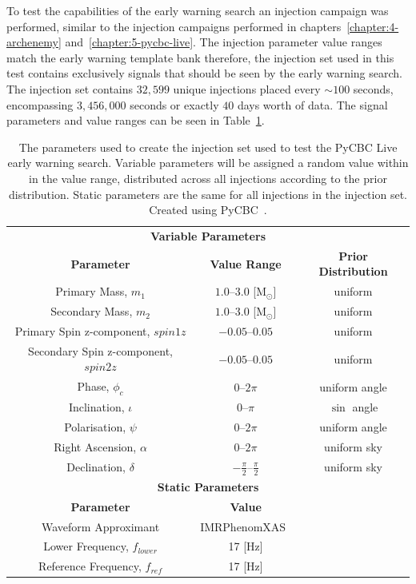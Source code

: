To test the capabilities of the early warning search an injection campaign was performed, similar to the injection campaigns performed in chapters~\ref{chapter:4-archenemy} and~\ref{chapter:5-pycbc-live}. The injection parameter value ranges match the early warning template bank therefore, the injection set used in this test contains exclusively signals that should be seen by the early warning search. The injection set contains $32,599$ unique injections placed every ${\sim}100$ seconds, encompassing $3,456,000$ seconds or exactly $40$ days worth of data. The signal parameters and value ranges can be seen in Table~\ref{6:tab:ew_inj_params}.
%
\begin{table}[ht]
    \centering
    \setlength{\tabcolsep}{4pt}
    \begin{tabular}{ccc}
        \toprule
        \multicolumn{3}{c}{\textbf{Variable Parameters}} \\
        \cmidrule(lr){1-3}
        \textbf{Parameter} & \textbf{Value Range} & \textbf{Prior Distribution} \\
        \midrule
        Primary Mass, $m_1$ & $1.0\text{--}3.0$ [$\text{M$_{\odot}$}$] & uniform \\
        Secondary Mass, $m_2$ & $1.0\text{--}3.0$ [$\text{M$_{\odot}$}$] & uniform \\
        Primary Spin z-component, $spin1z$ & $-0.05\text{--}0.05$ & uniform \\
        Secondary Spin z-component, $spin2z$ & $-0.05\text{--}0.05$ & uniform \\
        Phase, $\phi_{c}$ & $0\text{--}2\pi$ & uniform angle \\
        Inclination, $\iota$ & $0\text{--}\pi$ & $\sin$ angle \\
        Polarisation, $\psi$ & $0\text{--}2\pi$ & uniform angle \\
        Right Ascension, $\alpha$ & $0\text{--}2\pi$ & uniform sky \\
        Declination, $\delta$ & $-\frac{\pi}{2}\text{--}\frac{\pi}{2}$ & uniform sky \\
        \bottomrule
        \multicolumn{3}{c}{\textbf{Static Parameters}} \\
        \cmidrule(lr){1-3}
        \textbf{Parameter} & \textbf{Value} & \textbf{} \\
        \midrule
        Waveform Approximant & IMRPhenomXAS~\cite{IMRPhenomXAS:2020} & \\
        Lower Frequency, $f_{lower}$ & 17 [$\text{Hz}$] & \\
        Reference Frequency, $f_{ref}$ & 17 [$\text{Hz}$] & \\
        \bottomrule
    \end{tabular}
    \caption{The parameters used to create the injection set used to test the PyCBC Live early warning search. Variable parameters will be assigned a random value within in the value range, distributed across all injections according to the prior distribution. Static parameters are the same for all injections in the injection set. Created using PyCBC~\cite{PyCBC_package:2021}.}
    \label{6:tab:ew_inj_params}
\end{table}
%

